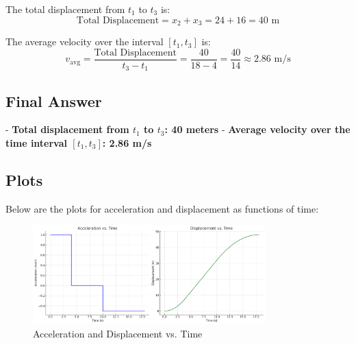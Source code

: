 The total displacement from $t_1$ to $t_3$ is:
\[
\text{Total Displacement} = x_2 + x_3 = 24 + 16 = 40 \text{ m}
\]

The average velocity over the interval $[t_1, t_3]$ is:
\[
v_{\text{avg}} = \frac{\text{Total Displacement}}{t_3 - t_1} = \frac{40}{18 - 4} = \frac{40}{14} \approx 2.86 \text{ m/s}
\]

\subsection*{Final Answer}

- \textbf{Total displacement from $t_1$ to $t_3$: 40 meters}
- \textbf{Average velocity over the time interval $[t_1, t_3]$: 2.86 m/s}

\subsection*{Plots}
Below are the plots for acceleration and displacement as functions of time:

\begin{figure}[h]
\centering
\includegraphics[width=0.8\textwidth]{acceleration_displacement.png}
\caption{Acceleration and Displacement vs. Time}
\end{figure}
